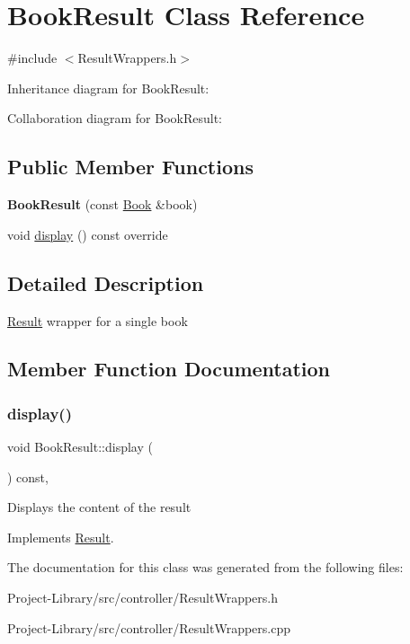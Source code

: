 \hypertarget{classBookResult}{}\section{Book\+Result Class Reference}
\label{classBookResult}


{\ttfamily \#include $<$Result\+Wrappers.\+h$>$}



Inheritance diagram for Book\+Result\+:


Collaboration diagram for Book\+Result\+:
\subsection*{Public Member Functions}
\begin{DoxyCompactItemize}
\item 
\mbox{\label{classBookResult_a4acf679fbb36bbf19e78921eeb6c1a8c}} 
{\bfseries Book\+Result} (const \hyperlink{classBook}{Book} \&book)
\item 
void \hyperlink{classBookResult_a091c20c6e1c90f30020a4b7298602680}{display} () const override
\end{DoxyCompactItemize}


\subsection{Detailed Description}
\hyperlink{classResult}{Result} wrapper for a single book 

\subsection{Member Function Documentation}
\mbox{\label{classBookResult_a091c20c6e1c90f30020a4b7298602680}} 
\subsubsection{\texorpdfstring{display()}{display()}}
{\footnotesize\ttfamily void Book\+Result\+::display (\begin{DoxyParamCaption}{ }\end{DoxyParamCaption}) const\hspace{0.3cm}{\ttfamily [override]}, {\ttfamily [virtual]}}

Displays the content of the result 

Implements \hyperlink{classResult_a625729bae46b53c231feb50a91b1390e}{Result}.



The documentation for this class was generated from the following files\+:\begin{DoxyCompactItemize}
\item 
Project-\/\+Library/src/controller/Result\+Wrappers.\+h\item 
Project-\/\+Library/src/controller/Result\+Wrappers.\+cpp\end{DoxyCompactItemize}
